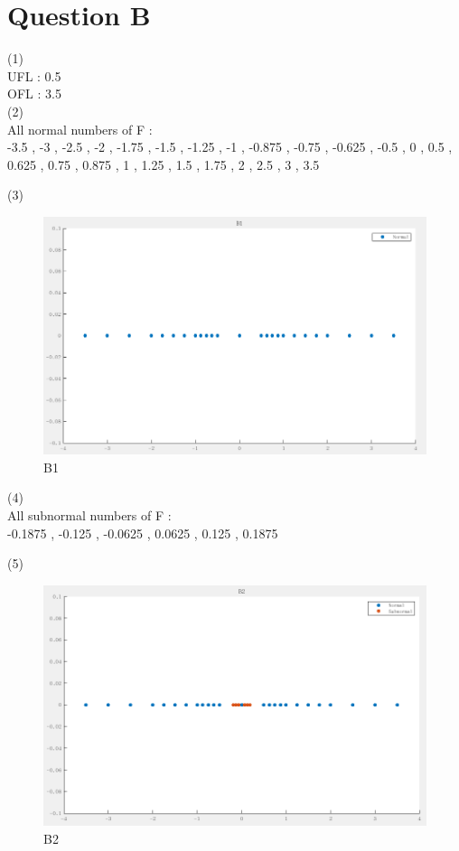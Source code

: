 \documentclass{ctexart}
\begin{document}
\section*{Question B}
\begin{flushleft}
  (1)\\
  UFL : 0.5\\
  OFL : 3.5\\

  (2)\\
  All normal numbers of F : \\
  -3.5 , -3 , -2.5 , -2 , -1.75 , -1.5 , -1.25 , -1 , -0.875 , -0.75 , -0.625 , -0.5 , 0 , 0.5 , 0.625 , 0.75 , 0.875 , 1 , 1.25 , 1.5 , 1.75 , 2 , 2.5 , 3 , 3.5

  
  (3)\\
  \begin{figure}[H]
  \centering
    \centering
    \includegraphics[width=12cm]{B1}
    \caption{B1}
  \end{figure}

  \clearpage
  
  (4)\\
  All subnormal numbers of F : \\
  -0.1875 , -0.125 , -0.0625 , 0.0625 , 0.125 , 0.1875

  (5)\\
  \begin{figure}[H]
  \centering
    \centering
    \includegraphics[width=12cm]{B2}
    \caption{B2}
  \end{figure}
\end{flushleft}
\end{document}
